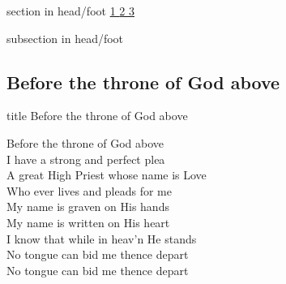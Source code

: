 \documentclass[aspectratio=169]{beamer}
\begin{document}
{
{ 
 {
 \begin{beamercolorbox}[ht=4.5ex,dp=1.5ex,%
      leftskip=.3cm,rightskip=.3cm plus1fil]{section in head/foot}
 \fontsize{12}{25}\selectfont 
\hyperlink{Before the throne of God above[]1}{1  }\hyperlink{Before the throne of God above[]2}{2  }\hyperlink{Before the throne of God above[]3}{3  } 
 \end{beamercolorbox}%
  \begin{beamercolorbox}[ht=2.5ex,dp=1.125ex,%
   leftskip=.3cm,rightskip=.3cm plus1fil]{subsection in head/foot}
   \insertauthor
 \end{beamercolorbox}%
 }
}
\subsection{Before the throne of God above}
\hypertarget{Before the throne of God above[]}{}
\begin{frame}{}
 \vfill
  \centering
  \begin{beamercolorbox}[sep=8pt,center,shadow=true,rounded=true]{title}
    Before the throne of God above     
  \end{beamercolorbox}
  \vfill
\end{frame}

\hypertarget{Before the throne of God above[]1}{}
\begin{frame}{}
\fontsize{16.666666666666668}{20.0}\selectfont

Before the throne of God above\\ 
I have a strong and perfect plea\\ 
A great High Priest whose name is Love\\ 
Who ever lives and pleads for me\\ 
My name is graven on His hands\\ 
My name is written on His heart\\ 
I know that while in heav'n He stands\\ 
No tongue can bid me thence depart\\ 
No tongue can bid me thence depart

\end{frame}
\hypertarget{Before the throne of God above[]2}{}
\begin{frame}{}
\fontsize{16.666666666666668}{20.0}\selectfont


\end{frame}}
\end{document}
